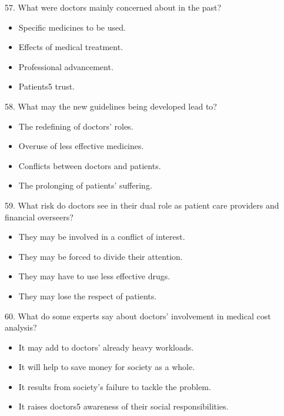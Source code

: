 \documentclass[UTF8,11pt]{ctexart}
\begin{document}
57. What were doctors mainly concerned about in the past?


\begin{itemize}[leftmargin=2em,itemsep=.2em,topsep=.4em]\item[A.] Specific medicines to be used.
\item[B.] Effects of medical treatment.
\item[C.] Professional advancement.
\item[D.] Patients5 trust.
\end{itemize}

58. What may the new guidelines being developed lead to?


\begin{itemize}[leftmargin=2em,itemsep=.2em,topsep=.4em]\item[A.] The redefining of doctors’ roles.
\item[B.] Overuse of less effective medicines.
\item[C.] Conflicts between doctors and patients.
\item[D.] The prolonging of patients’ suffering.
\end{itemize}

59. What risk do doctors see in their dual role as patient care providers and financial overseers?


\begin{itemize}[leftmargin=2em,itemsep=.2em,topsep=.4em]\item[A.] They may be involved in a conflict of interest.
\item[B.] They may be forced to divide their attention.
\item[C.] They may have to use less effective drugs.
\item[D.] They may lose the respect of patients.
\end{itemize}

60. What do some experts say about doctors’ involvement in medical cost analysis?


\begin{itemize}[leftmargin=2em,itemsep=.2em,topsep=.4em]\item[A.] It may add to doctors’ already heavy workloads.
\item[B.] It will help to save money for society as a whole.
\item[C.] It results from society’s failure to tackle the problem.
\item[D.] It raises doctors5 awareness of their social responsibilities.
\end{itemize}
\end{document}
